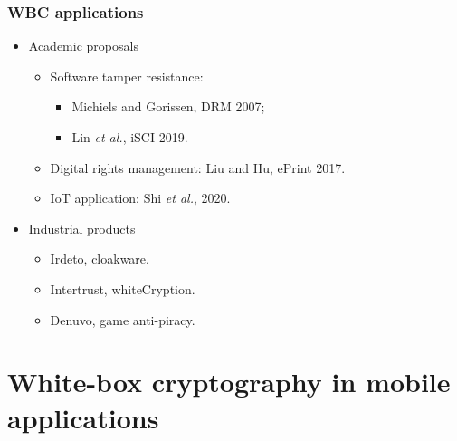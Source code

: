 \documentclass{beamer}
\begin{document}
\frame
{
\frametitle{WBC applications}

\begin{itemize}
\item Academic proposals
\begin{itemize}
\item Software tamper resistance:
\begin{itemize}
\item Michiels and Gorissen, DRM 2007;
\item Lin \textit{et al.}, iSCI 2019.
\end{itemize}

\item Digital rights management: Liu and Hu, ePrint 2017.

\item IoT application: Shi \textit{et al.}, 2020.

\end{itemize}

\item Industrial products
\begin{itemize}
\item Irdeto, cloakware.
\item Intertrust, whiteCryption.
\item Denuvo, game anti-piracy.
\end{itemize}
\end{itemize}

}

\section{White-box cryptography in mobile applications}
\end{document}
